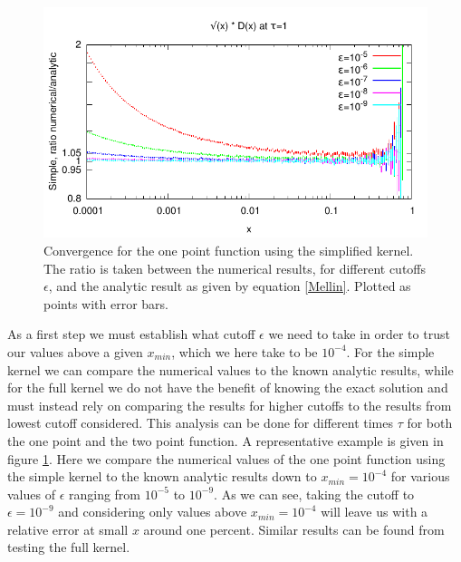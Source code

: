 \documentclass[a4paper,12pt]{article}
\numberwithin{equation}{section}
\begin{document}






\begin{figure}
\centering
\includegraphics[width=0.9\linewidth]{convergence.pdf}
\caption{Convergence for the one point function using the simplified kernel. The ratio is taken between the numerical results, for different cutoffs $\epsilon$, and the analytic result as given by equation \eqref{Mellin}. Plotted as points with error bars.}\label{convergence}
\end{figure}

As a first step we must establish what cutoff $\epsilon$ we need to take in order to trust our values above a given $x_{min}$, which we here take to be $10^{-4}$. For the simple kernel we can compare the numerical values to the known analytic results, while for the full kernel we do not have the benefit of knowing the exact solution and must instead rely on comparing the results for higher cutoffs to the results from lowest cutoff considered. This analysis can be done for different times $\tau$ for both the one point and the two point function. A representative example is given in figure \ref{convergence}. Here we compare the numerical values of the one point function using the simple kernel to the known analytic results down to $x_{min}=10^{-4}$ for various values of $\epsilon$ ranging from $10^{-5}$ to $10^{-9}$. As we can see, taking the cutoff to $\epsilon=10^{-9}$ and considering only values above $x_{min}=10^{-4}$ will leave us with a relative error at small $x$ around one percent. Similar results can be found from testing the full kernel. 
\end{document}
